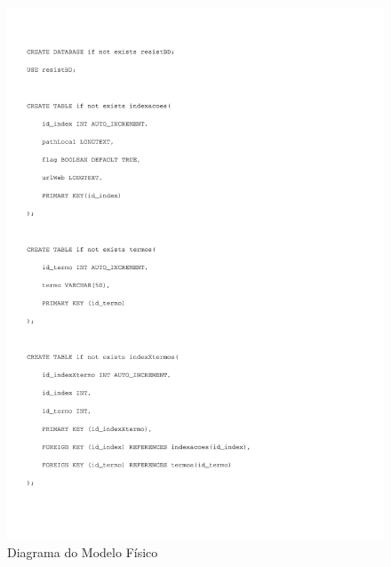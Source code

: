 \documentclass[
  a4paper,%
  12pt,%
  english,%
  brazilian,%
]{article}
\begin{document}

\clearpage

\begin{figure}[H]
    \centering
    \caption{Diagrama do Modelo Físico}
    \label{fig:fis}
    \includegraphics[width=\textwidth,page=1]{Logos/resistBD_script.pdf}
\end{figure}



\begin{center}
\end{center}
\end{document}
